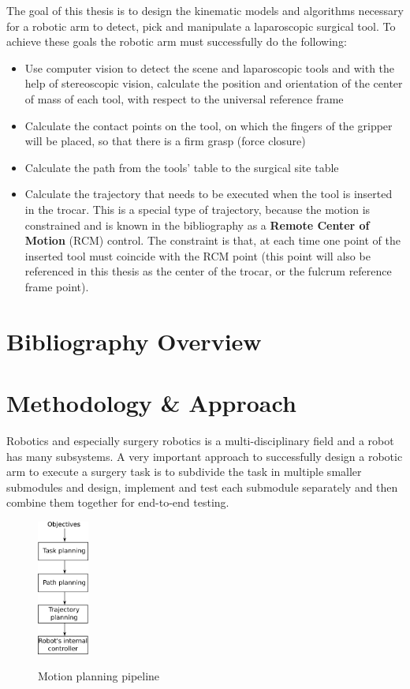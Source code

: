 The goal of this thesis is to design the kinematic models and algorithms necessary for a robotic arm to detect, pick and manipulate a laparoscopic surgical tool. To achieve these goals the robotic arm must 
successfully do the following:
\begin{itemize}
\item Use computer vision to detect the scene and laparoscopic tools and with the help of stereoscopic vision, calculate the position and orientation of the center of mass of each tool, with respect to the 
universal reference frame
\item Calculate the contact points on the tool, on which the fingers of the gripper will be placed, so that there is a firm grasp (force closure)
\item Calculate the path from the tools' table to the surgical site table
\item Calculate the trajectory that needs to be executed when the tool is inserted in the trocar. This is a special type of trajectory, because the motion is constrained and is known in the bibliography as
a \textbf{Remote Center of Motion} (RCM) control. The constraint is that, at each time one point of the inserted tool must coincide with the RCM point (this point will also be referenced in this thesis as the center of the 
trocar, or the fulcrum reference frame point).
\end{itemize}

\section{Bibliography Overview}

\section{Methodology \& Approach}

Robotics and especially surgery robotics is a multi-disciplinary field and a robot has many subsystems. A very important approach to successfully design a robotic arm to execute a surgery task is to subdivide the 
task in multiple smaller submodules and design, implement and test each submodule separately and then combine them together for end-to-end testing.

\begin{center}
\begin{figure}[H]
\centering
\includegraphics[width=0.15\textwidth]{images/motion-planning.png}\\
\caption{Motion planning pipeline}
\end{figure}
\end{center}

